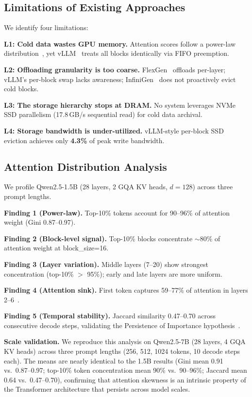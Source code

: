 \documentclass[conference]{IEEEtran}
\begin{document}
\subsection{Limitations of Existing Approaches}

We identify four limitations:

\textbf{L1: Cold data wastes GPU memory.} Attention scores follow a power-law distribution~\cite{h2o,scissorhands}, yet vLLM~\cite{vllm} treats all blocks identically via FIFO preemption.

\textbf{L2: Offloading granularity is too coarse.} FlexGen~\cite{flexgen} offloads per-layer; vLLM's per-block swap lacks awareness; InfiniGen~\cite{infinigen} does not proactively evict cold blocks.

\textbf{L3: The storage hierarchy stops at DRAM.} No system leverages NVMe SSD parallelism (17.8\,GB/s sequential read) for cold data archival.

\textbf{L4: Storage bandwidth is under-utilized.} vLLM-style per-block SSD eviction achieves only \textbf{4.3\%} of peak write bandwidth.

\subsection{Attention Distribution Analysis}

We profile Qwen2.5-1.5B (28 layers, 2 GQA KV heads, $d{=}128$) across three prompt lengths.

\textbf{Finding 1 (Power-law).} Top-10\% tokens account for 90--96\% of attention weight (Gini 0.87--0.97).

\textbf{Finding 2 (Block-level signal).} Top-10\% blocks concentrate ${\sim}$80\% of attention weight at block\_size=16.

\textbf{Finding 3 (Layer variation).} Middle layers (7--20) show strongest concentration (top-10\% $>$ 95\%); early and late layers are more uniform.

\textbf{Finding 4 (Attention sink).} First token captures 59--77\% of attention in layers 2--6~\cite{streamingllm}.

\textbf{Finding 5 (Temporal stability).} Jaccard similarity 0.47--0.70 across consecutive decode steps, validating the Persistence of Importance hypothesis~\cite{scissorhands}.

\textbf{Scale validation.} We reproduce this analysis on Qwen2.5-7B (28 layers, 4 GQA KV heads) across three prompt lengths (256, 512, 1024 tokens, 10 decode steps each). The means are nearly identical to the 1.5B results (Gini mean 0.91 vs.\ 0.87--0.97; top-10\% token concentration mean 90\% vs.\ 90--96\%; Jaccard mean 0.64 vs.\ 0.47--0.70), confirming that attention skewness is an intrinsic property of the Transformer architecture that persists across model scales.
\end{document}
